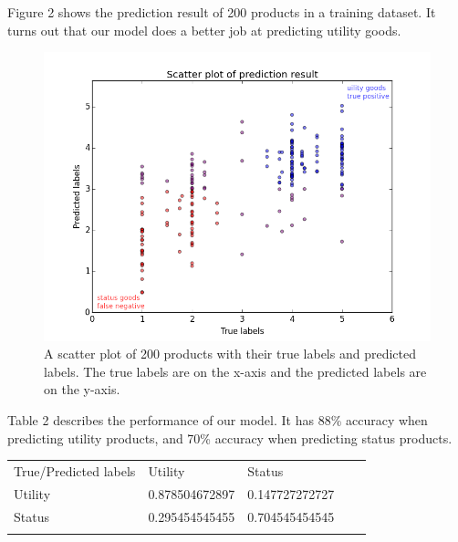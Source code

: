 \documentclass[dvips,12pt]{article}
\begin{document}
Figure 2 shows the prediction result of 200 products in a training dataset. It turns out that our model does a better job at predicting utility goods.

\begin{figure}[h] \label{scatterplot}
	\includegraphics[scale=0.6]{scatter}
	\centering
	\caption{A scatter plot of 200 products with their true labels and predicted labels. The true labels are on the x-axis and the predicted labels are on the y-axis.}
\end{figure}

Table 2 describes the performance of our model. It has 88\% accuracy when predicting utility products, and 70\% accuracy when predicting status products.

\begin{table}[] \label{fpr}
	\centering
	\label{my-label}
	\begin{tabular}{lllll}
		\cline{1-3}
		\multicolumn{1}{|l|}{True/Predicted labels} & \multicolumn{1}{l|}{Utility}        & \multicolumn{1}{l|}{Status}                &  &  \\ \cline{1-3}
		\multicolumn{1}{|l|}{Utility}               & \multicolumn{1}{l|}{0.878504672897} & \multicolumn{1}{l|}{0.147727272727}        &  &  \\ \cline{1-3}
		\multicolumn{1}{|l|}{Status}                & \multicolumn{1}{l|}{0.295454545455} & \multicolumn{1}{l|}{0.704545454545} &  &  \\ \cline{1-3}
		&                                     &                                            &  & 
	\end{tabular}
\end{table}
\end{document}
